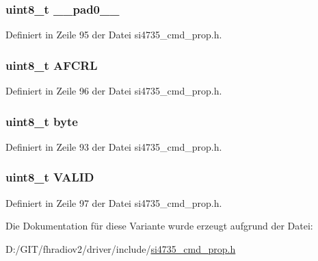 \subsubsection[{\+\_\+\+\_\+pad0\+\_\+\+\_\+}]{\setlength{\rightskip}{0pt plus 5cm}uint8\+\_\+t \+\_\+\+\_\+pad0\+\_\+\+\_\+}\label{unionfm__tune__status__resp1_a8b4eebe79ded0459acec2f4950102ba3}


Definiert in Zeile 95 der Datei si4735\+\_\+cmd\+\_\+prop.\+h.

\hypertarget{unionfm__tune__status__resp1_aec3ecfbd976645f2d3d4067f32271635}{}
\subsubsection[{A\+F\+C\+R\+L}]{\setlength{\rightskip}{0pt plus 5cm}uint8\+\_\+t A\+F\+C\+R\+L}\label{unionfm__tune__status__resp1_aec3ecfbd976645f2d3d4067f32271635}


Definiert in Zeile 96 der Datei si4735\+\_\+cmd\+\_\+prop.\+h.

\hypertarget{unionfm__tune__status__resp1_a96f44d20f1dbf1c8785a7bc99a46164c}{}
\subsubsection[{byte}]{\setlength{\rightskip}{0pt plus 5cm}uint8\+\_\+t byte}\label{unionfm__tune__status__resp1_a96f44d20f1dbf1c8785a7bc99a46164c}


Definiert in Zeile 93 der Datei si4735\+\_\+cmd\+\_\+prop.\+h.

\hypertarget{unionfm__tune__status__resp1_a58bd81dc31c117b187f38fbc118b393e}{}
\subsubsection[{V\+A\+L\+I\+D}]{\setlength{\rightskip}{0pt plus 5cm}uint8\+\_\+t V\+A\+L\+I\+D}\label{unionfm__tune__status__resp1_a58bd81dc31c117b187f38fbc118b393e}


Definiert in Zeile 97 der Datei si4735\+\_\+cmd\+\_\+prop.\+h.



Die Dokumentation für diese Variante wurde erzeugt aufgrund der Datei\+:\begin{DoxyCompactItemize}
\item 
D\+:/\+G\+I\+T/fhradiov2/driver/include/\hyperlink{si4735__cmd__prop_8h}{si4735\+\_\+cmd\+\_\+prop.\+h}\end{DoxyCompactItemize}

